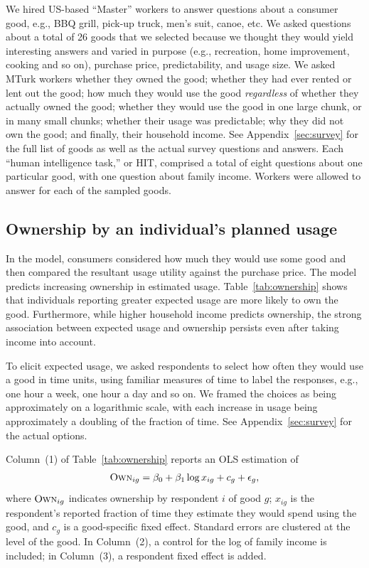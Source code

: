 \documentclass[11pt]{article}
\begin{document}
We hired US-based ``Master'' workers to answer questions about a consumer good, e.g., BBQ grill, pick-up truck, men's suit, canoe, etc.
We asked questions about a total of 26 goods that we selected because we thought they would yield interesting answers and varied in purpose (e.g., recreation, home improvement, cooking and so on), purchase price, predictability, and usage size. 
We asked MTurk workers whether they owned the good; whether they had ever rented or lent out the good; how much they would use the good \emph{regardless} of whether they actually owned the good; whether they would use the good in one large chunk, or in many small chunks; whether their usage was predictable; why they did not own the good; and finally, their household income. 
See Appendix~\ref{sec:survey} for the full list of goods as well as the actual survey questions and answers.  
Each ``human intelligence task,'' or HIT, comprised a total of eight questions about one particular good, with one question about family income. 
Workers were allowed to answer for each of the sampled goods.  

\subsection{Ownership by an individual's planned usage} 
In the model, consumers considered how much they would use some good and then compared the resultant usage utility against the purchase price. 
The model predicts increasing ownership in estimated usage.
Table~\ref{tab:ownership} shows that individuals reporting greater expected usage are more likely to own the good.
Furthermore, while higher household income predicts ownership, the strong association between expected usage and ownership persists even after taking income into account.

To elicit expected usage, we asked respondents to select how often they would use a good in time units, using familiar measures of time to label the responses, e.g., one hour a week, one hour a day and so on.
We framed the choices as being approximately on a logarithmic scale, with each increase in usage being approximately a doubling of the fraction of time.
See Appendix~\ref{sec:survey} for the actual options.

Column~(1) of Table~\ref{tab:ownership} reports an OLS estimation of 
\begin{align} \label{eq:base_own}
\textsc{Own}_{ig} = \beta_0 + \beta_1 \log x_{ig} + c_{g} + \epsilon_{g}, 
\end{align}
where $\textsc{Own}_{ig}$ indicates ownership by respondent $i$ of good $g$; 
$x_{ig}$ is the respondent's reported fraction of time they estimate they would spend using the good, and $c_g$ is a good-specific fixed effect.
Standard errors are clustered at the level of the good. 
In Column~(2), a control for the log of family income is included;
in Column~(3), a respondent fixed effect is added. 
\end{document}
